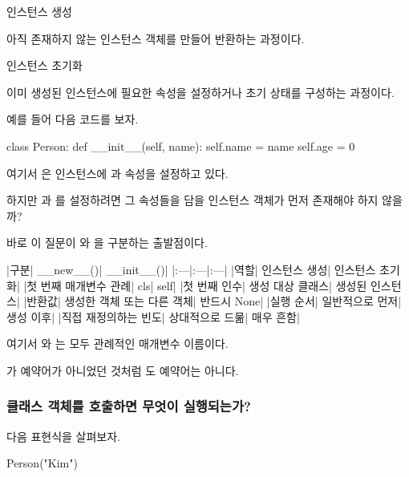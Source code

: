 \begin{dhknote}
\begin{dhksmry}[centered]
인스턴스 생성
\end{dhksmry}
\end{dhknote}

아직 존재하지 않는 인스턴스 객체를 만들어 반환하는 과정이다.

\begin{dhknote}
\begin{dhksmry}[centered]
인스턴스 초기화
\end{dhksmry}
\end{dhknote}

이미 생성된 인스턴스에 필요한 속성을 설정하거나 초기 상태를 구성하는 과정이다.

예를 들어 다음 코드를 보자.

\begin{dhkcode}
class Person:
    def __init__(self, name):
        self.name = name
        self.age = 0
\end{dhkcode}

여기서 은 인스턴스에 과  속성을 설정하고 있다.

하지만 과 를 설정하려면 그 속성들을 담을 인스턴스 객체가 먼저 존재해야 하지 않을까?

바로 이 질문이 와 을 구분하는 출발점이다.

\begin{dhktable}
|구분|	__new__()|	__init__()|
|:---|:---|:---|
|역할|	인스턴스 생성|	인스턴스 초기화|
|첫 번째 매개변수 관례|	cls|	self|
|첫 번째 인수|	생성 대상 클래스|	생성된 인스턴스|
|반환값|	생성한 객체 또는 다른 객체|	반드시 None|
|실행 순서|	일반적으로 먼저|	생성 이후|
|직접 재정의하는 빈도|	상대적으로 드묾|	매우 흔함|
\end{dhktable}

여기서 와 는 모두 관례적인 매개변수 이름이다.

가 예약어가 아니었던 것처럼 도 예약어는 아니다.

\subsubsection{클래스 객체를 호출하면 무엇이 실행되는가?}

다음 표현식을 살펴보자.

\begin{dhkcode}
Person("Kim")
\end{dhkcode}

